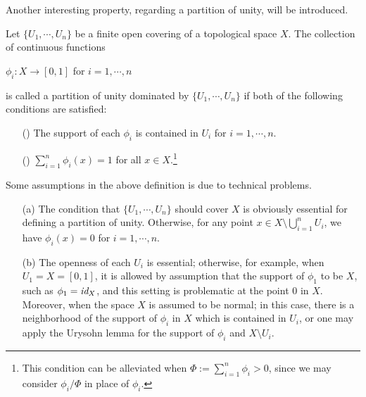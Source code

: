 Another interesting property, regarding a partition of unity, will be introduced.
\begin{defi}
    Let $\{U_1, \cdots, U_n\}$ be a finite open covering of a topological space $X$.
    The collection of continuous functions
    \begin{center}
        $\phi_i: X\rightarrow [0, 1]$ for $i=1, \cdots, n$
    \end{center}
    is called a partition of unity dominated by $\{U_1, \cdots, U_n\}$ if both of the following conditions are satisfied:
    \begin{enumerate}
        \item[(\romannumeral 1)]
        {
            The support of each $\phi_i$ is contained in $U_i$ for $i=1, \cdots, n$.
        }
        \item[(\romannumeral 2)]
        {
            $\sum_{i=1}^n \phi_i(x)=1$ for all $x\in X$.\footnote{This condition can be alleviated when $\Phi:=\sum_{i=1}^n \phi_i>0$, since we may consider $\phi_i/\Phi$ in place of $\phi_i$.}
        }
    \end{enumerate}
\end{defi}
\begin{rmk}
    Some assumptions in the above definition is due to technical problems.
    \begin{enumerate}
        \item[(a)]
        {
            The condition that $\{U_1, \cdots, U_n\}$ should cover $X$ is obviously essential for defining a partition of unity.
            Otherwise, for any point $x\in X\setminus\bigcup_{i=1}^n U_i$, we have $\phi_i(x)=0$ for $i=1, \cdots, n$.
        }
        \item[(b)]
        {
            The openness of each $U_i$ is essential; otherwise, for example, when $U_1=X=[0, 1]$, it is allowed by assumption that the support of $\phi_1$ to be $X$, such as $\phi_1=\textit{id}_{X}$, and this setting is problematic at the point 0 in $X$.
            Moreover, when the space $X$ is assumed to be normal; in this case, there is a neighborhood of the support of $\phi_i$ in $X$ which is contained in $U_i$, or one may apply the Urysohn lemma for the support of $\phi_i$ and $X\setminus U_i$.
        }
    \end{enumerate}
\end{rmk}

